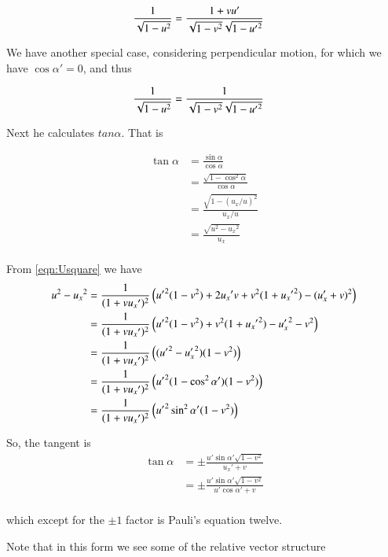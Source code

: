 \begin{align*}
\frac{1}{\sqrt{1-u^2}} 
&= \frac{ 1 + v u' }{\sqrt{1 -v^2 }\sqrt{1 -{u'}^2}}
\end{align*}

We have another special case, considering perpendicular motion, for which we have $\cos\alpha' = 0$, and thus

\begin{align*}
\frac{1}{\sqrt{1-u^2}} 
&= \frac{ 1 }{\sqrt{1 -v^2 }\sqrt{1 -{u'}^2}}
\end{align*}

Next he calculates $tan \alpha$.  That is

\begin{align*}
\tan\alpha 
&= \frac{\sin\alpha}{\cos\alpha} \\
&= \frac{\sqrt{1-\cos^2\alpha}}{\cos\alpha} \\
&= \frac{\sqrt{1-(u_x/u)^2}}{u_x/u} \\
&= \frac{\sqrt{u^2- {u_x}^2}}{u_x} \\
\end{align*}

From \ref{eqn:Usquare} we have
\begin{align*}
u^2 - {u_x}^2
&= \frac{1}{( 1 + v {u_x}' )^2 } \left(
{{u}'}^2(1-v^2)
+ 2 {u_x}' v
+v^2 (1 + {{u_x}'}^2)
-(u_x' + v)^2
\right) \\
&= \frac{1}{( 1 + v {u_x}' )^2 } \left(
{{u}'}^2(1-v^2)
+v^2 (1 + {{u_x}'}^2)
- {u_x'}^2 
- v^2 
\right) \\
&= \frac{1}{( 1 + v {u_x}' )^2 } \left(
({{u}'}^2 -{u_x'}^2) (1-v^2)
\right) \\
&= \frac{1}{( 1 + v {u_x}' )^2 } \left(
{{u}'}^2(1 -\cos^2\alpha') (1-v^2)
\right) \\
&= \frac{1}{( 1 + v {u_x}' )^2 } \left(
{{u}'}^2 \sin^2\alpha' (1-v^2)
\right) \\
\end{align*}

So, the tangent is
\begin{align*}
\tan\alpha 
&= \pm \frac{ u' \sin\alpha' \sqrt{1-v^2}}{ {u_x}' + v  } \\
&= \pm \frac{ u' \sin\alpha' \sqrt{1-v^2}}{ u'\cos\alpha' + v  } \\
\end{align*}

which except for the $\pm 1$ factor is Pauli's equation twelve.

Note that in this form we see some of the relative vector structure

